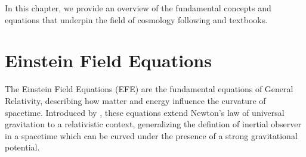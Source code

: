 In this chapter, we provide an overview of the fundamental concepts and equations that underpin the field of cosmology following  \citet{2003moco.book.....D} and \citet{2008cosm.book.....W} textbooks.

\section{Einstein Field Equations}
The Einstein Field Equations (EFE) are the fundamental equations of General Relativity, describing how matter and energy influence the curvature of spacetime. Introduced by \citet{1915SPAW.......844E}, these equations extend Newton's law of universal gravitation to a relativistic context, generalizing the defintion of inertial observer in a spacetime which can be curved under the presence of a strong gravitational potential.

